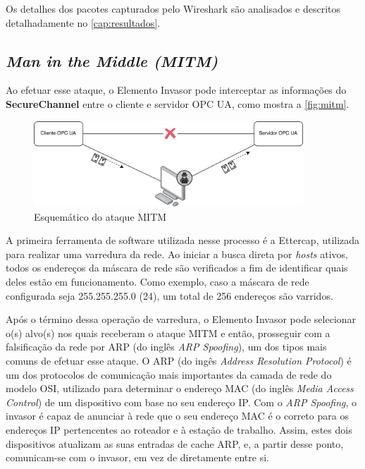     Os detalhes dos pacotes capturados pelo Wireshark são analisados e descritos detalhadamente no \autoref{cap:resultados}.
    
    \subsection{\textit{Man in the Middle (MITM)}}

    Ao efetuar esse ataque, o Elemento Invasor pode interceptar as informações do \textbf{SecureChannel} entre o cliente e servidor OPC UA, como mostra a \autoref{fig:mitm}.

    \begin{figure}[htbp]
        \caption{\label{fig:mitm}Esquemático do ataque MITM}
        \begin{center}
            \includegraphics[width=0.9\textwidth]{USPSC-img/mitm.png}
        \end{center}
    \end{figure}
    
    A primeira ferramenta de software utilizada nesse processo é a Ettercap, utilizada para realizar uma varredura da rede. Ao iniciar a busca direta por \textit{hosts} ativos, todos os endereços da máscara de rede são verificados a fim de identificar quais deles estão em funcionamento. Como exemplo, caso a máscara de rede configurada seja 255.255.255.0 (24), um total de 256 endereços são varridos.
    
    Após o término dessa operação de varredura, o Elemento Invasor pode selecionar o(s) alvo(s) nos quais receberam o ataque MITM e então, prosseguir com a falsificação da rede por ARP (do inglês \textit{ARP Spoofing}), um dos tipos mais comuns de efetuar esse ataque. O ARP (do ingês \textit{Address Resolution Protocol}) é um dos protocolos de comunicação mais importantes da camada de rede do modelo OSI, utilizado para determinar o endereço MAC (do inglês \textit{Media Access Control}) de um dispositivo com base no seu endereço IP. Com o \textit{ARP Spoofing}, o invasor é capaz de anunciar à rede que o seu endereço MAC é o correto para os endereços IP pertencentes ao roteador e à estação de trabalho. Assim, estes dois dispositivos atualizam as suas entradas de cache ARP, e, a partir desse ponto, comunicam-se com o invasor, em vez de diretamente entre si.

